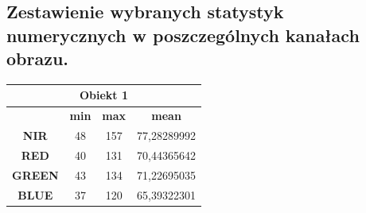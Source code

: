 \documentclass[a4paper,12pt]{article}  %
\begin{document}
\begin{figure}[H]
\hfill
{}
\hfill
{}
\hfill
{}
\hfill
{}
\hfill
\end{figure}

\newpage
\subsection{Zestawienie wybranych statystyk numerycznych w poszczególnych kanałach obrazu.}

\begin{table}[h!]
\centering
\begin{tabular}{|c|c|c|c|}
\hline
\multicolumn{4}{|c|}{\textbf{Obiekt 1}} \\ \hline
\textbf{} & \textbf{min} & \textbf{max} & \textbf{mean} \\ \hline
\textbf{NIR} & 48 & 157 & 77,28289992\\ \hline
\textbf{RED} & 40 & 131 & 70,44365642\\ \hline
\textbf{GREEN} & 43 & 134 & 71,22695035\\ \hline
\textbf{BLUE} & 37 & 120 & 65,39322301\\ \hline
\end{tabular}
\end{table}
\end{document}
